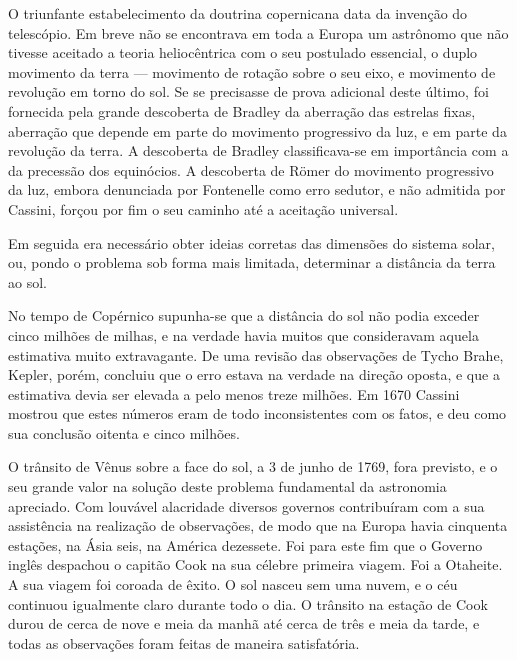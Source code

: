 \documentclass[11pt,a5paper,twoside,openany]{book}
\begin{document}
O triunfante estabelecimento da doutrina copernicana data da invenção do telescópio. Em breve não se encontrava em toda a Europa um astrônomo que não tivesse aceitado a teoria heliocêntrica com o seu postulado essencial, o duplo movimento da terra — movimento de rotação sobre o seu eixo, e movimento de revolução em torno do sol. Se se precisasse de prova adicional deste último, foi fornecida pela grande descoberta de Bradley da aberração das estrelas fixas, aberração que depende em parte do movimento progressivo da luz, e em parte da revolução da terra. A descoberta de Bradley classificava-se em importância com a da precessão dos equinócios. A descoberta de Römer do movimento progressivo da luz, embora denunciada por Fontenelle como erro sedutor, e não admitida por Cassini, forçou por fim o seu caminho até a aceitação universal.

Em seguida era necessário obter ideias corretas das dimensões do sistema solar, ou, pondo o problema sob forma mais limitada, determinar a distância da terra ao sol.

No tempo de Copérnico supunha-se que a distância do sol não podia exceder cinco milhões de milhas, e na verdade havia muitos que consideravam aquela estimativa muito extravagante. De uma revisão das observações de Tycho Brahe, Kepler, porém, concluiu que o erro estava na verdade na direção oposta, e que a estimativa devia ser elevada a pelo menos treze milhões. Em 1670 Cassini mostrou que estes números eram de todo inconsistentes com os fatos, e deu como sua conclusão oitenta e cinco milhões.

O trânsito de Vênus sobre a face do sol, a 3 de junho de 1769, fora previsto, e o seu grande valor na solução deste problema fundamental da astronomia apreciado. Com louvável alacridade diversos governos contribuíram com a sua assistência na realização de observações, de modo que na Europa havia cinquenta estações, na Ásia seis, na América dezessete. Foi para este fim que o Governo inglês despachou o capitão Cook na sua célebre primeira viagem. Foi a Otaheite. A sua viagem foi coroada de êxito. O sol nasceu sem uma nuvem, e o céu continuou igualmente claro durante todo o dia. O trânsito na estação de Cook durou de cerca de nove e meia da manhã até cerca de três e meia da tarde, e todas as observações foram feitas de maneira satisfatória.
\end{document}
